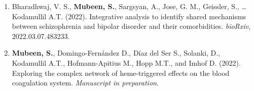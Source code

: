 \begin{enumerate}
    \item Bharadhwaj, V. S., \textbf{Mubeen, S.}, Sargsyan, A., Jose, G. M., Geissler, S.,  … Kodamullil A.T. (2022). Integrative analysis to identify shared mechanisms between schizophrenia and bipolar disorder and their comorbidities. \textit{bioRxiv}, 2022.03.07.483233.
    \item \textbf{Mubeen, S.}, Domingo-Fern\'{a}ndez D., Díaz del Ser S., Solanki, D., Kodamullil A.T., Hofmann-Apitius M., Hopp M.T.,\textsuperscript{\textdagger} and Imhof D.\textsuperscript{\textdagger} (2022). Exploring the complex network of heme-triggered effects on the blood coagulation system. \textit{Manuscript in preparation}.


\end{enumerate}